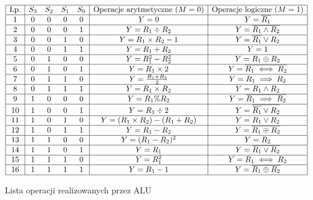 \documentclass[../main.tex]{subfiles}
\begin{document}
        \begin{table}[ht]
            \[
            \begin{array}{|c|cccc|c|c|}
            \hline
            \text{Lp.} & S_3 & S_2 & S_1 & S_0 & \text{Operacje arytmetyczne ($M = 0$)} & \text{Operacje logiczne ($M = 1$)} \\ \hline
            1  & 0 & 0 & 0 & 0 & Y = 0             & Y = \overline{R_1} \\ \hline
            2  & 0 & 0 & 0 & 1 & Y = R_1 \div R_2     & Y = \overline{R_1 \land R_2} \\ \hline
            3  & 0 & 0 & 1 & 0 & Y = R_1 \times R_2 - 1 & Y = \overline{R_1} \lor R_2 \\ \hline
            4  & 0 & 0 & 1 & 1 & Y = R_1 + R_2     & Y = 1 \\ \hline
            5  & 0 & 1 & 0 & 0 & Y = R_1^2 - R_2^2 & Y = R_1 \oplus R_2 \\ \hline
            6  & 0 & 1 & 0 & 1 & Y = R_1 \times 2  & Y = \overline{R_1 \iff R_2} \\ \hline
            7  & 0 & 1 & 1 & 0 & Y = \frac{R_1 + R_2}{2} & Y = R_1 \implies R_2 \\ \hline
            8  & 0 & 1 & 1 & 1 & Y = R_1 \times R_2 & Y = R_1 \land R_2 \\ \hline
            9  & 1 & 0 & 0 & 0 & Y = R_1 \% R_2     & Y = \overline{R_1 \implies R_2} \\ \hline
            10 & 1 & 0 & 0 & 1 & Y = R_1 \div 2     & Y = \overline{\overline{R_1} \lor R_2} \\ \hline
            11 & 1 & 0 & 1 & 0 & Y = (R_1 \times R_2) - (R_1 + R_2) & Y = R_1 \lor R_2 \\ \hline
            12 & 1 & 0 & 1 & 1 & Y = R_1 - R_2     & Y = \overline{R_1 \oplus R_2} \\ \hline
            13 & 1 & 1 & 0 & 0 & Y = (R_1 - R_2)^2 & Y = R_2 \\ \hline
            14 & 1 & 1 & 0 & 1 & Y = R_1           & Y = \overline{R_1 \vee R_2} \\ \hline
            15 & 1 & 1 & 1 & 0 & Y = R_1^2         & Y = R_1 \iff R_2 \\ \hline
            16 & 1 & 1 & 1 & 1 & Y = R_1 - 1       & Y = \overline{R_1 \oplus R_2} \\ \hline
            \end{array}
            \]
            \caption{Lista operacji realizowanych przez ALU}
            \label{tab:operacje_alu}
        \end{table}
\end{document}
